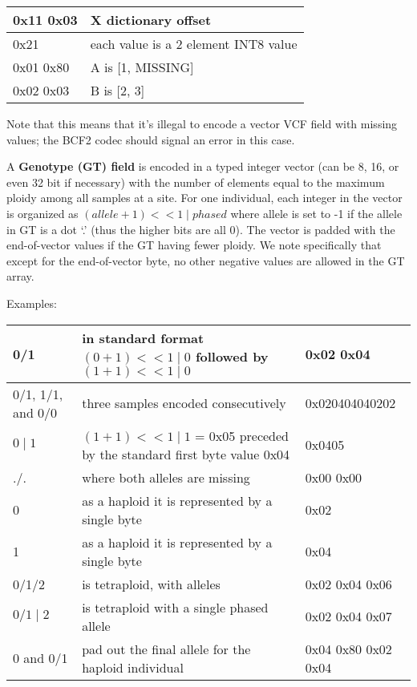\documentclass[8pt]{article}
\begin{document}
\vspace{0.3cm}
\begin{tabular}{|p{2cm} | l |} \hline
0x11 0x03 & X dictionary offset \\ \hline
0x21 & each value is a 2 element INT8 value \\ \hline
0x01 0x80 & A is [1, MISSING] \\ \hline
0x02 0x03 & B is [2, 3] \\ \hline
\end{tabular}
\vspace{0.3cm}

Note that this means that it's illegal to encode a vector VCF field with missing values; the BCF2 codec should signal an error in this case.

\vspace{0.3cm}
A \textbf{Genotype (GT) field} is encoded in a typed integer vector (can be 8,
16, or even 32 bit if necessary) with the number of elements equal to the
maximum ploidy among all samples at a site.  For one individual, each integer
in the vector is organized as $(allele+1) << 1 \mid phased$ where allele is set
to -1 if the allele in GT is a dot `.' (thus the higher bits are all 0).  
The vector is padded with the end-of-vector values if the GT having fewer ploidy.
We note specifically that except for the end-of-vector byte, no other negative
values are allowed in the GT array.

Examples:

\vspace{0.3cm}
\small
\begin{tabular}{|p{2.5cm} | p{10cm} | p{3cm}|} \hline
0/1 & in standard format $(0 + 1) << 1 \mid 0$ followed by $(1 + 1) << 1 \mid 0$ & 0x02 0x04 \\ \hline
0/1, 1/1, and 0/0 & three samples encoded consecutively & 0x020404040202 \\ \hline
$0\mid1$ & $(1 + 1) << 1 \mid 1$ = 0x05 preceded by the standard first byte value 0x04 & 0x0405 \\ \hline
./. & where both alleles are missing & 0x00 0x00 \\ \hline
0 & as a haploid it is represented by a single byte & 0x02 \\ \hline
1 & as a haploid it is represented by a single byte & 0x04 \\ \hline
0/1/2 & is tetraploid, with alleles & 0x02 0x04 0x06 \\ \hline
$0/1\mid2$ & is tetraploid with a single phased allele & 0x02 0x04 0x07 \\ \hline
0 and 0/1 & pad out the final allele for the haploid individual & 0x04 0x80 0x02 0x04\\ \hline
\end{tabular}
\normalsize
\end{document}
